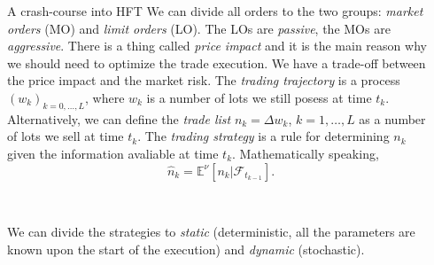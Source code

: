 \documentclass[]{beamer}
\begin{document}
\begin{frame}[t]
\begin{columns}[t]
\begin{column}{\twocolwid}
\begin{columns}[t,totalwidth=\twocolwid]
\begin{column}{\onecolwid}
    \begin{block}{A crash-course into HFT}
        We can divide all orders to 
        the two groups: \emph{market orders} (MO) and \emph{limit orders} (LO). 
        The LOs are \emph{passive}, the MOs are \emph{aggressive}.
        There is a thing called \emph{price impact} and it is the main reason why we should need to 
        optimize the trade execution. We have a trade-off between the 
        price impact and the market risk.
        The \emph{trading trajectory} is a process $(w_k)_{k = 0, \dots, L}$, where $w_k$ is a number of lots we 
        still posess at time $t_k$. Alternatively, we can define the \emph{trade list} $n_k = \Delta w_k$, $k = 1, \dots, L$ as a 
        number of lots we sell at time $t_k$.
        The \emph{trading strategy} is a rule for determining $n_k$ given the information avaliable at time $t_k$. Mathematically speaking,
        \begin{equation*}
            \hat n_k = \mathbb{E}^\nu\left[n_k\vert \mathcal{F}_{t_{k-1}}\right]. 
        \end{equation*} 

        \

        We can divide the strategies to \emph{static} (deterministic, all the parameters are known upon the start of the execution) and \emph{dynamic} (stochastic).
    

    \end{block}
   
    
    
    \end{column} %
    
    \begin{column}{\onecolwid} %
    
    

\end{column}
\end{columns}
\end{column}
\end{columns}
\end{frame}
\end{document}
